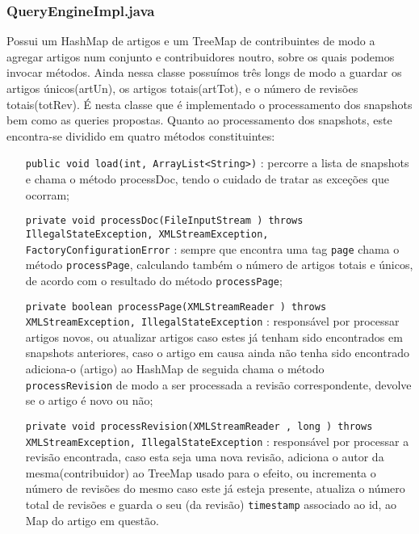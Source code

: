 \documentclass[a4paper,11pt]{article}
\begin{document}
\subsubsection{QueryEngineImpl.java}
Possui um HashMap de artigos e um TreeMap de contribuintes de modo a agregar artigos num conjunto e contribuidores noutro, sobre os quais podemos invocar métodos. Ainda nessa classe possuímos três longs de modo a guardar os artigos únicos(artUn), os artigos totais(artTot), e o número de revisões totais(totRev). É nesta classe que é implementado o processamento dos snapshots bem como as queries propostas. Quanto ao processamento dos snapshots, este encontra-se dividido em quatro métodos constituintes:
\begin{itemize}[align=left]
\item[\texttt{public void load(int, ArrayList<String>)}] : percorre a lista de snapshots e chama o método processDoc, tendo o cuidado de tratar as exceções que ocorram;
\item[\texttt{private void processDoc(FileInputStream ) throws IllegalStateException, XMLStreamException, FactoryConfigurationError}] : sempre que encontra uma tag \texttt{page} chama o método \texttt{processPage}, calculando também o número de artigos totais e únicos, de acordo com o resultado do método \texttt{processPage};
\item[\texttt{private boolean processPage(XMLStreamReader ) throws XMLStreamException, IllegalStateException}]: responsável por processar artigos novos, ou atualizar artigos caso estes já tenham sido encontrados em snapshots anteriores, caso o artigo em causa ainda não tenha sido encontrado adiciona-o (artigo) ao HashMap de seguida chama o método \texttt{processRevision} de modo a ser processada a revisão correspondente, devolve se o artigo é novo ou não;
\item[\texttt{private void processRevision(XMLStreamReader , long ) throws XMLStreamException, IllegalStateException}]: responsável por processar a revisão encontrada, caso esta seja uma nova revisão, adiciona o autor da mesma(contribuidor) ao TreeMap usado para o efeito, ou incrementa o número de revisões do mesmo caso este já esteja presente, atualiza o número total de revisões e guarda o seu (da revisão) \texttt{timestamp} associado ao id, ao Map do artigo em questão.
\end{itemize}
\end{document}
